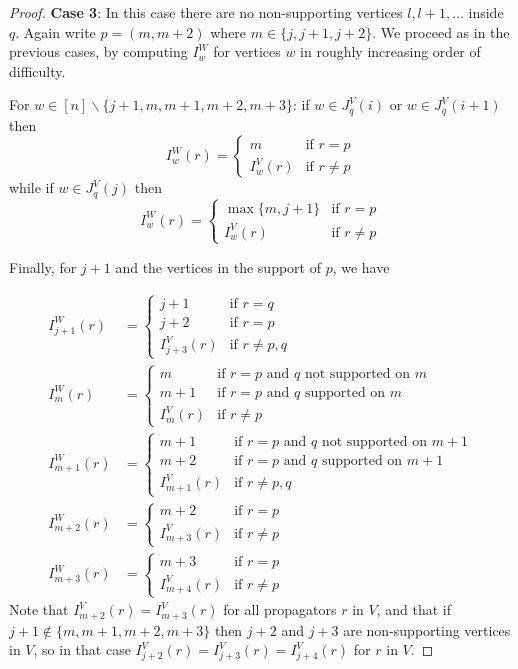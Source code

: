 \documentclass[11pt]{article}
\theoremstyle{remark}
\theoremstyle{definition}
\begin{document}
\begin{proof}
\textbf{Case 3}: In this case there are no non-supporting vertices $l, l+1, \ldots$ inside $q$.  Again write $p=(m, m+2)$ where $m\in \{j, j+1, j+2\}$. We proceed as in the previous cases, by computing $I^{W}_w$ for vertices $w$ in roughly increasing order of difficulty.

For $w \in [n]\backslash\{j+1,m,m+1,m+2,m+3\}$: if $w\in J_q^{V}(i)$ or $w\in J_q^{V}(i+1)$ then
    \[
    I_w^{W}(r) =  \begin{cases}
        m & \text{if } r=p \\
        I_{w}^{V}(r) & \text{if } r\neq p
      \end{cases} 
    \]
    while if $w\in J_q^{V}(j)$ then
    \[
    I_w^{W}(r) =  \begin{cases}
        \max\{m, j+1\} & \text{if } r=p \\
        I_{w}^{V}(r) & \text{if } r\neq p
      \end{cases} 
    \]

Finally, for $j+1$ and the vertices in the support of $p$, we have

\begin{align*}
  I_{j+1}^{W}(r) &= \begin{cases}
    j+1 & \text{if } r=q\\
    j+2 & \text{if } r=p\\
    I_{j+3}^{V}(r) & \text{if } r\neq p,q
  \end{cases}\\
  I_m^{W}(r) &= \begin{cases}
    m & \text{if $r=p$ and $q$ not supported on $m$}\\
    m+1 & \text{if $r=p$ and $q$ supported on $m$}\\
    I_{m}^{V}(r) & \text{if } r\neq p
  \end{cases}\\
  I_{m+1}^{W}(r) & = \begin{cases}
    m+1 & \text{if $r=p$ and $q$ not supported on $m+1$} \\
    m+2 & \text{if $r=p$ and $q$ supported on $m+1$} \\
    I_{m+1}^{V}(r) & \text{if } r\neq p,q
  \end{cases}\\
  I_{m+2}^{W}(r) & = \begin{cases}
    m+2 & \text{if } r=p \\
    I_{m+3}^{V}(r) & \text{if } r\neq p
  \end{cases}\\
  I_{m+3}^{W}(r) & = \begin{cases}
    m+3 & \text{if } r=p \\
    I_{m+4}^{V}(r) & \text{if } r\neq p
  \end{cases}
\end{align*}
Note that $I_{m+2}^{V}(r) = I_{m+3}^{V}(r)$ for all propagators $r$ in $V$, and that if $j+1\not\in\{m, m+1, m+2, m+3\}$ then $j+2$ and $j+3$ are non-supporting vertices in $V$, so in that case $I_{j+2}^{V}(r) = I_{j+3}^{V}(r) = I_{j+4}^{V}(r)$ for $r$ in $V$. 


\end{proof}
\end{document}
